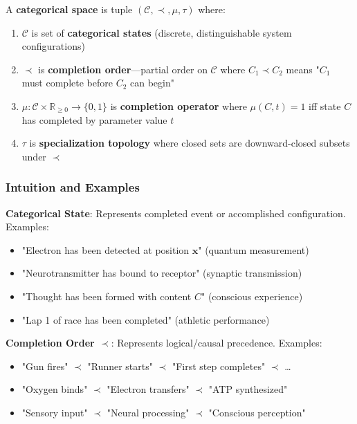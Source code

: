 \documentclass[11pt,onecolumn]{article}
\begin{document}
\begin{definition}
\label{def:categorical_space}
A \textbf{categorical space} is tuple $(\mathcal{C}, \prec, \mu, \tau)$ where:
\begin{enumerate}
\item $\mathcal{C}$ is set of \textbf{categorical states} (discrete, distinguishable system configurations)
\item $\prec$ is \textbf{completion order}---partial order on $\mathcal{C}$ where $C_1 \prec C_2$ means "$C_1$ must complete before $C_2$ can begin"
\item $\mu: \mathcal{C} \times \mathbb{R}_{\geq 0} \to \{0, 1\}$ is \textbf{completion operator} where $\mu(C, t) = 1$ iff state $C$ has completed by parameter value $t$
\item $\tau$ is \textbf{specialization topology} where closed sets are downward-closed subsets under $\prec$
\end{enumerate}
\end{definition}

\subsubsection{Intuition and Examples}

\textbf{Categorical State}: Represents completed event or accomplished configuration. Examples:
\begin{itemize}
\item "Electron has been detected at position $\mathbf{x}$" (quantum measurement)
\item "Neurotransmitter has bound to receptor" (synaptic transmission)
\item "Thought has been formed with content $C$" (conscious experience)
\item "Lap 1 of race has been completed" (athletic performance)
\end{itemize}

\textbf{Completion Order $\prec$}: Represents logical/causal precedence. Examples:
\begin{itemize}
\item "Gun fires" $\prec$ "Runner starts" $\prec$ "First step completes" $\prec$ \ldots
\item "Oxygen binds" $\prec$ "Electron transfers" $\prec$ "ATP synthesized"
\item "Sensory input" $\prec$ "Neural processing" $\prec$ "Conscious perception"
\end{itemize}
\end{document}
